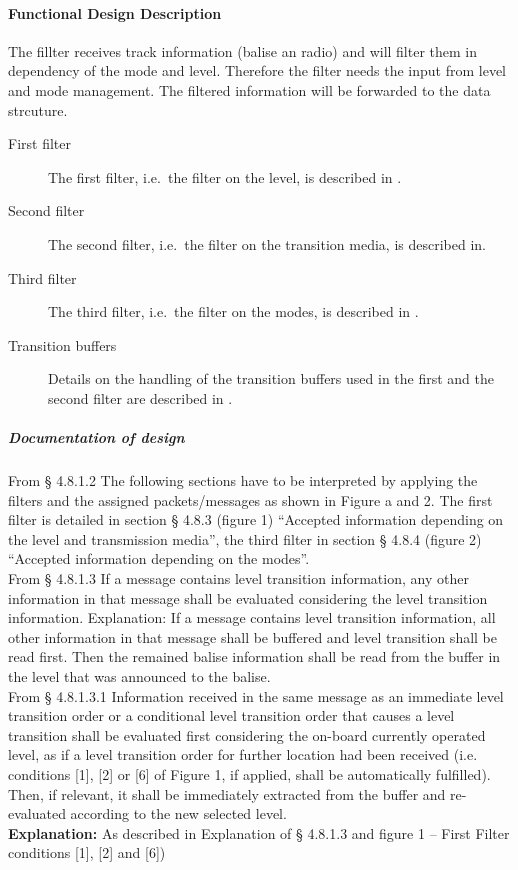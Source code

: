 \paragraph{Functional Design Description}
The fillter receives track information (balise an radio) and will filter them in dependency of the mode and level.
Therefore the filter needs the input from level and mode management. The filtered information will be forwarded to the data strcuture.

\begin{description}
\item[First filter] The first filter, i.e.~the filter on the level, is described in \cite[Chapter~4.8.3]{subset-026}.
\item[Second filter] The second filter, i.e.~the filter on the transition media, is described in\cite[Chapter~4.8.3]{subset-026}.
\item[Third filter]
 The third filter, i.e.~the filter on the modes, is described in \cite[Chapter~4.8.4]{subset-026}.
\item[Transition buffers] Details on the handling of the transition buffers used in the first and the second filter are described in \cite[Chapter~4.8.5]{subset-026}.
\end{description}

\subparagraph{Documentation of design}
From § 4.8.1.2 The following sections have to be interpreted by applying the filters and the assigned packets/messages as shown in Figure a and 2. The first filter is detailed in section § 4.8.3 (figure 1) “Accepted information depending on the level and transmission media”, the third filter in section § 4.8.4 (figure 2) “Accepted information depending on the modes”.\\

From § 4.8.1.3 If a message contains level transition information, any other information in that message shall be evaluated considering the level transition information. Explanation: If a message contains level transition information, all other information in that message shall be buffered and level transition shall be read first. Then the remained balise information shall be read from the buffer in the level that was announced to the balise.\\

From § 4.8.1.3.1 Information received in the same message as an immediate level transition order or a conditional level transition order that causes a level transition shall be evaluated first considering the on-board currently operated level, as if a level transition order for further location had been received (i.e. conditions [1], [2] or [6] of Figure 1, if applied, shall be automatically fulfilled). Then, if relevant, it shall be immediately extracted from the buffer and re-evaluated according to the new selected level.\\
\textbf{Explanation:} As described in Explanation of § 4.8.1.3 and figure 1 – First Filter conditions [1], [2] and [6])\\

